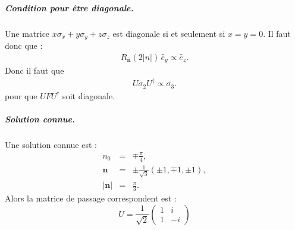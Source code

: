 \subparagraph{Condition pour être diagonale.}
Une matrice $x \sigma_x + y \sigma_y + z \sigma_z$ est diagonale si et seulement si $x=y=0$. Il faut donc que :
\begin{eqnarray}
R_{\hat{\bm{n}}}(2\vert n \vert ) \, \hat{e}_y \propto \hat{e}_z.
\end{eqnarray}
Donc il faut que 
\begin{eqnarray}
U \sigma_2 U^\dagger \propto \sigma_3.
\end{eqnarray}
pour que $U F U^\dagger $ soit diagonale.

\subparagraph{Solution connue.}
Une solution connue est :
\begin{eqnarray}
    n_0 & = & \mp\frac{\pi}{4},\\
\bm{n} &=& \pm \frac{1}{\sqrt{3}} (\pm 1,\mp 1, \pm 1 ), \\
\vert \bm{n} \vert  &=& \frac{\pi}{3}.
\end{eqnarray}
Alors la matrice de passage correspondent est :
\begin{equation}
    U = \frac{1}{\sqrt{2}}\begin{pmatrix} 1 & i \\ 1 & -i \end{pmatrix}
\end{equation}

